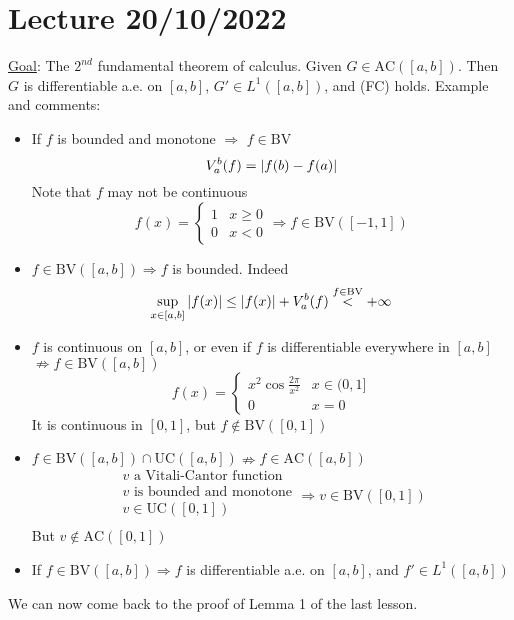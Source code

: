 \section{Lecture 20/10/2022}
\noindent\underline{Goal}: The \(2^{nd}\) fundamental theorem of calculus. Given \(G \in \mbox{AC}([a,b])\). Then \(G\) is differentiable a.e. on \([a,b]\), \(G' \in L^1([a,b])\), and (FC) holds.
Example and comments:
\begin{itemize}
    \item If \(f\) is bounded and monotone \(\Rightarrow\) \(f \in \mbox{BV}\)
    \[
        V_a^b (f) = \abs{f(b) - f(a)}
    \]
    Note that \(f\) may not be continuous
    \[
        f(x) = \begin{cases}
            1 & x \geq 0 \\
            0 & x < 0
        \end{cases}
        \Rightarrow f \in \mbox{BV}([-1,1])
    \]
    \item \(f \in \mbox{BV}([a,b]) \Rightarrow f\) is bounded. Indeed
    \[
        \sup_{x \in [a,b]} \abs{f(x)} \leq \abs{f(x)} + V_a^b(f) \overset{f \in \text{BV}}{<} +\infty
    \]
    \item \(f\) is continuous on \([a,b]\), or even if  \(f\) is differentiable everywhere in \([a,b]\) \(\nRightarrow f \in \mbox{BV}([a,b])\)
    \[
        f(x) = \begin{cases}
            x^2\cos{\frac{2\pi}{x^2}} & x \in (0,1] \\
            0 & x = 0
        \end{cases}
    \]
    It is continuous in \([0,1]\), but \(f \notin \mbox{BV}([0,1])\)
    \item \(f \in \mbox{BV}([a,b]) \cap \mbox{UC}([a,b])  \nRightarrow f \in \mbox{AC}([a,b])\)
    \[\begin{array}{l}
        v \mbox{ a Vitali-Cantor function} \\ v \mbox{ is bounded and monotone} \\ 
        v \in \mbox{UC}([0,1]) \\ 
        
    \end{array}
    \Rightarrow v \in \mbox{BV}([0,1]) 
    \]
    But \(v \not \in \mbox{AC}([0,1])\)
    \item If \(f \in \mbox{BV}([a,b]) \Rightarrow f\) is differentiable a.e. on \([a,b]\), and \(f' \in L^1([a,b])\)
\end{itemize}
We can now come back to the proof of Lemma 1 of the last lesson.

